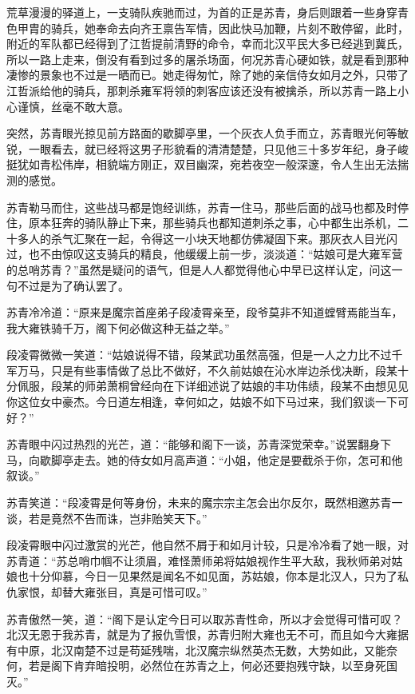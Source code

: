 荒草漫漫的驿道上，一支骑队疾驰而过，为首的正是苏青，身后则跟着一些身穿青色甲胄的骑兵，她奉命去向齐王禀告军情，因此快马加鞭，片刻不敢停留，此时，附近的军队都已经得到了江哲提前清野的命令，幸而北汉平民大多已经逃到冀氏，所以一路上走来，倒没有看到过多的屠杀场面，何况苏青心硬如铁，就是看到那种凄惨的景象也不过是一晒而已。她走得匆忙，除了她的亲信侍女如月之外，只带了江哲派给他的骑兵，那刺杀雍军将领的刺客应该还没有被擒杀，所以苏青一路上小心谨慎，丝毫不敢大意。

突然，苏青眼光掠见前方路面的歇脚亭里，一个灰衣人负手而立，苏青眼光何等敏锐，一眼看去，就已经将这男子形貌看的清清楚楚，只见他三十多岁年纪，身子峻挺犹如青松伟岸，相貌端方刚正，双目幽深，宛若夜空一般深邃，令人生出无法揣测的感觉。

苏青勒马而住，这些战马都是饱经训练，苏青一住马，那些后面的战马也都及时停住，原本狂奔的骑队静止下来，那些骑兵也都知道刺杀之事，心中都生出杀机，二十多人的杀气汇聚在一起，令得这一小块天地都仿佛凝固下来。那灰衣人目光闪过，也不由惊叹这支骑兵的精良，他缓缓上前一步，淡淡道：“姑娘可是大雍军营的总哨苏青？”虽然是疑问的语气，但是人人都觉得他心中早已这样认定，问这一句不过是为了确认罢了。

苏青冷冷道：“原来是魔宗首座弟子段凌霄亲至，段爷莫非不知道螳臂焉能当车，我大雍铁骑千万，阁下何必做这种无益之举。”

段凌霄微微一笑道：“姑娘说得不错，段某武功虽然高强，但是一人之力比不过千军万马，只是有些事情做了总比不做好，不久前姑娘在沁水岸边杀伐决断，段某十分佩服，段某的师弟萧桐曾经向在下详细述说了姑娘的丰功伟绩，段某不由想见见你这位女中豪杰。今日道左相逢，幸何如之，姑娘不如下马过来，我们叙谈一下可好？”

苏青眼中闪过热烈的光芒，道：“能够和阁下一谈，苏青深觉荣幸。”说罢翻身下马，向歇脚亭走去。她的侍女如月高声道：“小姐，他定是要截杀于你，怎可和他叙谈。”

苏青笑道：“段凌霄是何等身份，未来的魔宗宗主怎会出尔反尔，既然相邀苏青一谈，若是竟然不告而诛，岂非贻笑天下。”

段凌霄眼中闪过激赏的光芒，他自然不屑于和如月计较，只是冷冷看了她一眼，对苏青道：“苏总哨巾帼不让须眉，难怪萧师弟将姑娘视作生平大敌，我秋师弟对姑娘也十分仰慕，今日一见果然是闻名不如见面，苏姑娘，你本是北汉人，只为了私仇家恨，却替大雍张目，真是可惜可叹。”

苏青傲然一笑，道：“阁下是认定今日可以取苏青性命，所以才会觉得可惜可叹？北汉无恩于我苏青，就是为了报仇雪恨，苏青归附大雍也无不可，而且如今大雍据有中原，北汉南楚不过是苟延残喘，北汉魔宗纵然英杰无数，大势如此，又能奈何，若是阁下肯弃暗投明，必然位在苏青之上，何必还要抱残守缺，以至身死国灭。”

